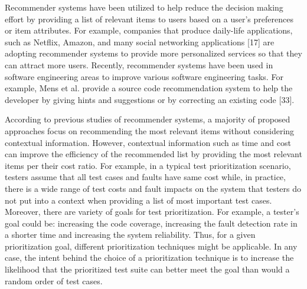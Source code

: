 Recommender systems have been utilized to help reduce the 
decision making effort by providing a list of relevant 
items to users based on a user’s preferences or item attributes. 
For example, companies that produce daily-life applications, 
such as Netflix, Amazon, and many social networking applications 
[17] are adopting recommender systems to provide more personalized 
services so that they can attract more users. Recently, 
recommender systems have been used in software engineering 
areas to improve various software engineering tasks. For example, 
Mens et al. provide a source code recommendation system to help 
the developer by giving hints and suggestions or by correcting an existing code [33]. 

According to previous studies of recommender systems, 
a majority of proposed approaches focus on recommending the most 
relevant items without considering contextual information. 
However, contextual information such as time and cost can improve 
the efficiency of the recommended list by providing the most 
relevant items per their cost ratio. For example, in a 
typical test prioritization scenario, testers assume that 
all test cases and faults have same cost while, in practice, 
there is a wide range of test costs and fault impacts on the 
system that testers do not put into a context when 
providing a list of most important test cases. Moreover, 
there are variety of goals for test prioritization. 
For example, a tester's goal could be: increasing the code coverage, 
increasing the fault detection rate in a shorter 
time and increasing the system reliability. 
Thus, for a given prioritization goal, 
different prioritization techniques might be applicable. 
In any case, the intent behind the choice of a prioritization technique 
is to increase the likelihood that the prioritized test suite can 
better meet the goal than would a random order of test cases.

